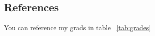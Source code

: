 \documentclass{article}
\begin{document}


\vspace{.5cm}


\subsection{References}
You can reference my grads in table ~\ref{tab:grades}
\end{document}
